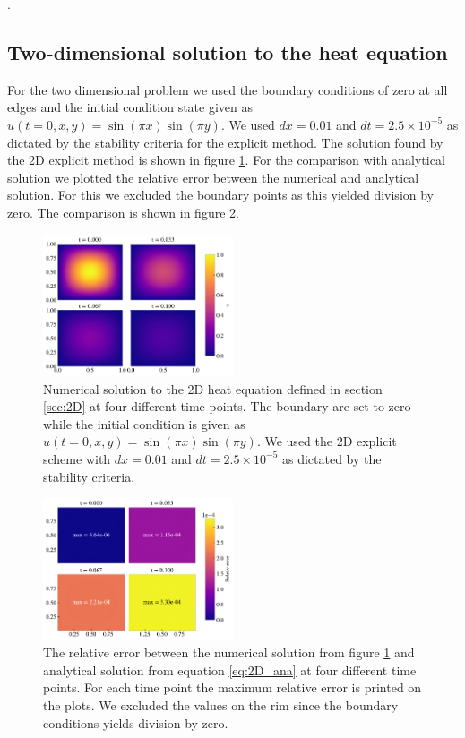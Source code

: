 \documentclass[%
 reprint,
nofootinbib,
aps,
]{revtex4-1}
\begin{document}
\twocolumngrid

.
\clearpage
\subsection{Two-dimensional solution to the heat equation }
For the two dimensional problem we used the boundary conditions of zero at all edges and the initial condition state given as $u(t{=}0,x,y) = \sin{(\pi x)}\sin{(\pi y)}$. We used $dx = 0.01$ and $dt = 2.5 \times 10^{-5}$ as dictated by the stability criteria for the explicit method. The solution found by the 2D explicit method is shown in figure \ref{fig:2D_sol}. For the comparison with analytical solution we plotted the relative error between the numerical and analytical solution. For this we excluded the boundary points as this yielded division by zero. The comparison is shown in figure \ref{fig:2D_compare}.


\begin{figure}[H]
    \centering
    \includegraphics[width=0.5\textwidth]{figures/2D_sol.pdf}
    \caption{Numerical solution to the 2D heat equation defined in section \ref{sec:2D} at four different time points. The boundary are set to zero while the initial condition is given as  $u(t{=}0,x,y) = \sin{(\pi x)}\sin{(\pi y)}$. We used the 2D explicit scheme with $dx = 0.01$ and $dt = 2.5 \times 10^{-5}$ as dictated by the stability criteria.}
    \label{fig:2D_sol}
\end{figure}

\begin{figure}[H]
    \centering
    \includegraphics[width=0.5\textwidth]{figures/2D_compare.pdf}
    \caption{The relative error between the numerical solution from figure \ref{fig:2D_sol} and analytical solution from equation \ref{eq:2D_ana} at four different time points. For each time point the maximum relative error is printed on the plots. We excluded the values on the rim since the boundary conditions yields division by zero.}
    \label{fig:2D_compare}
\end{figure}
\end{document}
